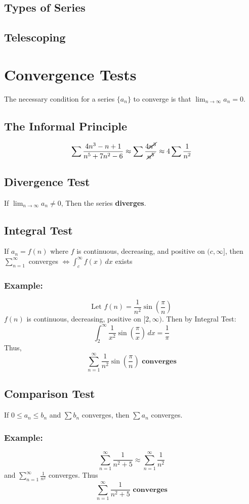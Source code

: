 \documentclass[11pt]{article}
\begin{document}
\subsection{Types of Series}
\subsection{Telescoping}
\section{Convergence Tests}
The necessary condition for a series $\{a_n\}$ to converge is that $\displaystyle\lim_{n\to\infty}a_n=0$.
\subsection{The Informal Principle}
\[
  \sum\frac{4n^3-n+1}{n^5+7n^2-6}\approx\sum\frac{4\cancel{n^3}}{\cancel{n^5}}\approx 4\sum\frac{1}{n^2}
\]
\subsection{Divergence Test}
If $\displaystyle\lim_{n\to\infty}a_n\neq0$, Then the series \textbf{diverges}.
\subsection{Integral Test}
If $a_n=f(n)$ where $f$ is continuous, decreasing, and positive on $(c,\infty]$, then $\displaystyle\sum_{n=1}^\infty$ converges $\displaystyle \iff\int_c^\infty f(x)\,dx$ exists
\subsubsection*{Example:}
\[
  \text{Let }f(n)=\frac{1}{n^2}\sin(\frac{\pi}{n})
\]
$f(n)$ is continuous, decreasing, positive on $[2,\infty)$. Then by Integral Test:
\[
  \int_{2}^{\infty}\frac{1}{x^2}\sin(\frac{\pi}{x})\,dx=\frac{1}{\pi}
\]
Thus,
\[
  \sum_{n=1}^\infty \frac{1}{n^2}\sin(\frac{\pi}{n})\textbf{ converges}
\]
\subsection{Comparison Test}
If $0\le a_n \le b_n$ and $\sum b_n$ converges, then $\sum a_n$ converges.
\subsubsection*{Example:}
\[
  \sum_{n=1}^\infty \frac{1}{n^2+5} \approx \sum_{n=1}^\infty \frac{1}{n^2}
\]
and $\displaystyle\sum_{n=1}^\infty \frac{1}{n^2}$ converges. Thus
\[
  \sum_{n=1}^\infty \frac{1}{n^2+5}\textbf{ converges}
\]
\end{document}
